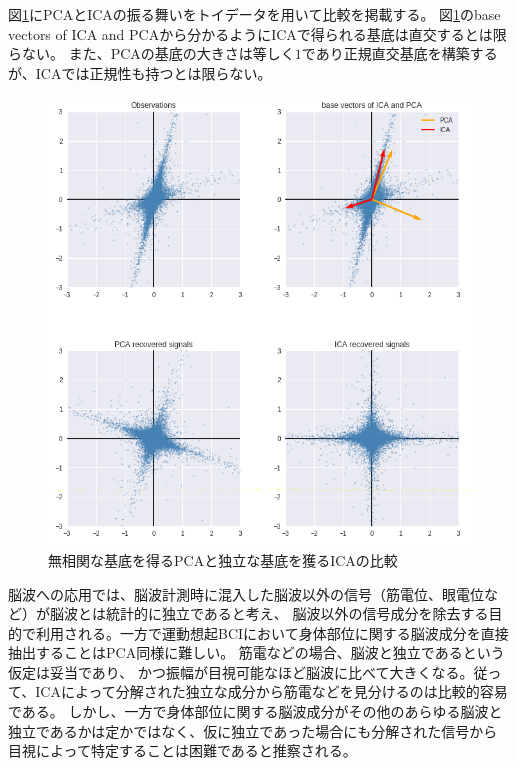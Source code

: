 図\ref{fig:ica_pca}にPCAとICAの振る舞いをトイデータを用いて比較を掲載する。
図\ref{fig:ica_pca}のbase vectors of ICA and PCAから分かるようにICAで得られる基底は直交するとは限らない。
また、PCAの基底の大きさは等しく\(1\)であり正規直交基底を構築するが、ICAでは正規性も持つとは限らない。
\begin{figure}
    \centering
    \includegraphics[width=15cm]{images/ica_pca.png}
    \caption{無相関な基底を得るPCAと独立な基底を獲るICAの比較}
    \label{fig:ica_pca}
\end{figure}


脳波への応用では、脳波計測時に混入した脳波以外の信号（筋電位、眼電位など）が脳波とは統計的に独立であると考え、
脳波以外の信号成分を除去する目的で利用される。一方で運動想起BCIにおいて身体部位に関する脳波成分を直接抽出することはPCA同様に難しい。
筋電などの場合、脳波と独立であるという仮定は妥当であり、
かつ振幅が目視可能なほど脳波に比べて大きくなる。従って、ICAによって分解された独立な成分から筋電などを見分けるのは比較的容易である。
しかし、一方で身体部位に関する脳波成分がその他のあらゆる脳波と独立であるかは定かではなく、仮に独立であった場合にも分解された信号から
目視によって特定することは困難であると推察される。

